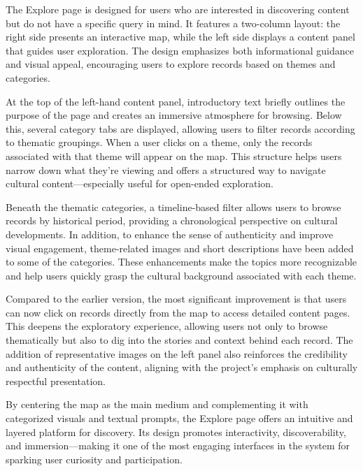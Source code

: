 The Explore page is designed for users who are interested in discovering content but do not have a specific query in mind. It features a two-column layout: the right side presents an interactive map, while the left side displays a content panel that guides user exploration. The design emphasizes both informational guidance and visual appeal, encouraging users to explore records based on themes and categories.

At the top of the left-hand content panel, introductory text briefly outlines the purpose of the page and creates an immersive atmosphere for browsing. Below this, several category tabs are displayed, allowing users to filter records according to thematic groupings. When a user clicks on a theme, only the records associated with that theme will appear on the map. This structure helps users narrow down what they're viewing and offers a structured way to navigate cultural content—especially useful for open-ended exploration.

Beneath the thematic categories, a timeline-based filter allows users to browse records by historical period, providing a chronological perspective on cultural developments. In addition, to enhance the sense of authenticity and improve visual engagement, theme-related images and short descriptions have been added to some of the categories. These enhancements make the topics more recognizable and help users quickly grasp the cultural background associated with each theme.

Compared to the earlier version, the most significant improvement is that users can now click on records directly from the map to access detailed content pages. This deepens the exploratory experience, allowing users not only to browse thematically but also to dig into the stories and context behind each record. The addition of representative images on the left panel also reinforces the credibility and authenticity of the content, aligning with the project's emphasis on culturally respectful presentation.

By centering the map as the main medium and complementing it with categorized visuals and textual prompts, the Explore page offers an intuitive and layered platform for discovery. Its design promotes interactivity, discoverability, and immersion—making it one of the most engaging interfaces in the system for sparking user curiosity and participation.

